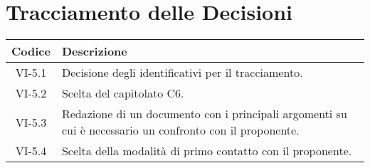 \section*{Tracciamento delle Decisioni}

\begin{center}
	\begin{longtable}{|c|p{14.5cm}|}
	\hline
	\rowcolor{lighter-grayer}
	\textbf{Codice} & \textbf{Descrizione} \\
	\hline
	\endfirsthead
	
	\hline
	VI-5.1 & Decisione degli identificativi per il tracciamento. \\
	\hline
	VI-5.2 & Scelta del capitolato C6. \\
	\hline
	VI-5.3 & Redazione di un documento con i principali argomenti su cui è necessario un confronto con il proponente. \\
	\hline
	VI-5.4 & Scelta della modalità di primo contatto con il proponente. \\
	\hline

	\end{longtable}
\end{center}